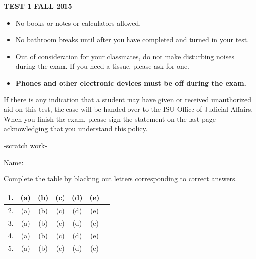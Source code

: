 \documentclass[fleqn,12pt]{article}
\newcommand{\<}{\ensuremath{\langle}}
\renewcommand{\>}{\ensuremath{\rangle}}
\begin{document}
\pagestyle{empty}



 \hfill {\bf TEST 1} \hfill {\bf FALL 2015}

\vskip1cm
\begin{itemize}
\item No books or notes or calculators allowed.
\item No bathroom breaks until after you have completed and turned in your test.
\item Out of consideration for your classmates, do not make
  disturbing noises during the exam. If you need a tissue, please ask for one.
\item {\bf Phones and other electronic devices must be off during the exam.}
\end{itemize}


\vskip2cm

  If there is any indication that a
student may have given or received unauthorized aid on this test, the case 
will be handed over to the ISU Office of Judicial Affairs.
When you finish the exam, please sign the statement on the last page
acknowledging that you understand this policy.

\newpage

\begin{center}
  -scratch work-
\end{center}

\newpage


\begin{flushright}
  Name: \underline{\phantom{XXXXXXXXXXXXXXXXX}}
\end{flushright}

Complete the table by blacking out letters corresponding to correct answers.
  
  \begin{center}
    \begin{tabular}{|r|c|c|c|c|c|c|}
      \hline
      1. & (a) & (b) & (c) & (d) & (e) \\[4pt]
      \hline
      2. & (a) & (b) & (c) & (d) & (e) \\[4pt]
      \hline
      3. & (a) & (b) & (c) & (d) & (e) \\[4pt]
      \hline
      4. & (a) & (b) & (c) & (d) & (e) \\[4pt]
      \hline
      5. & (a) & (b) & (c) & (d) & (e) \\[4pt]
      \hline
    \end{tabular}
  \end{center}
\end{document}
